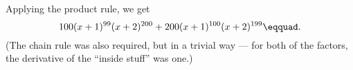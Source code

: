 Applying the product rule, we get
\begin{equation*}
  100(x+1)^{99}(x+2)^{200}+  200(x+1)^{100}(x+2)^{199}\eqquad.
\end{equation*}
(The chain rule was also required, but in a trivial way --- for both of
the factors, the derivative of the ``inside stuff'' was one.)
